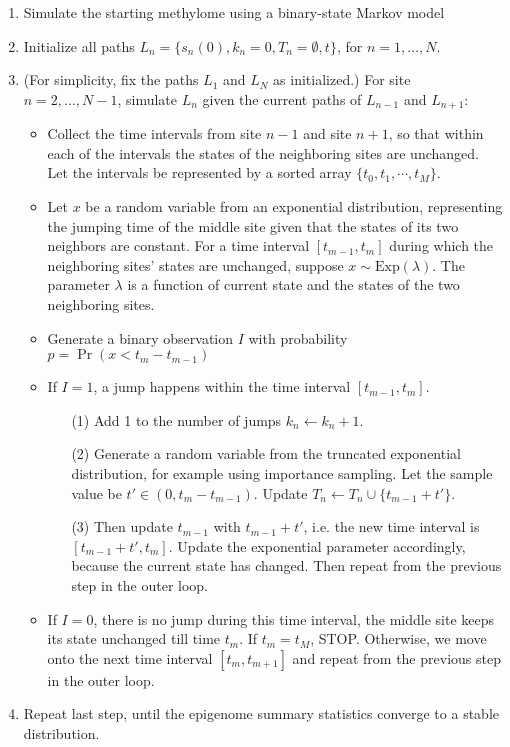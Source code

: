\documentclass[11pt]{article}
\begin{document}
\begin{enumerate}
\item Simulate the starting methylome using a binary-state Markov model
\item Initialize all paths $L_n = \{s_n(0), k_n=0, T_n=\emptyset, t\}$, for $n=1,\ldots, N.$
\item (For simplicity, fix the paths $L_1$ and $L_N$ as initialized.) For
  site $n = 2, \ldots, N-1$, simulate $L_n$ given the current paths of
  $L_{n-1}$ and $L_{n+1}$:
  \begin{itemize}
  \item Collect the time intervals from site $n-1$ and site $n+1$, so
    that within each of the intervals the states of the neighboring
    sites are unchanged. Let the intervals be represented by a sorted
    array $\{t_0, t_1, \cdots, t_M\}$.
  \item  Let $x$ be a random variable from an exponential
    distribution, representing the jumping time of the middle site given
    that the states of its two neighbors are constant.  For a time
    interval $[t_{m-1}, t_m]$ during which the neighboring sites' states
    are unchanged, suppose $x\sim \text{Exp}(\lambda)$. The parameter
    $\lambda$ is a function of current state and the states of the two
    neighboring sites.
  \item Generate a binary observation $I$ with probability $p = \Pr(x < t_m- t_{m-1})$
  \item If $I=1$, a jump happens within the time interval $[t_{m-1},
    t_m]$.
    \begin{enumerate}
      \item[(1)] Add 1 to the number of jumps $k_n \leftarrow k_n +1$.
      \item[(2)] Generate a random variable from the truncated exponential
        distribution, for example using importance sampling. Let the sample
        value be $t' \in (0, t_m -t_{m-1})$. Update $T_n \leftarrow
        T_n\cup\{t_{m-1}+t'\}$.
  \item[(3)] Then update $t_{m-1}$ with $t_{m-1}+t'$, i.e. the new
    time interval is $[t_{m-1}+t', t_m]$. Update the exponential parameter
    accordingly, because the current state has changed. Then repeat from
    the previous step in the outer loop.
    \end{enumerate}
  \item If $I=0$, there is no jump during this time interval, the
    middle site keeps its state unchanged till time $t_m$. If $t_m =
t_M$, STOP.  Otherwise, we move onto the next time interval $[t_m,
t_{m+1}]$ and repeat from the previous step in the outer loop.
  \end{itemize}
\item Repeat last step, until the epigenome summary statistics converge to
  a stable distribution.
\end{enumerate}
\end{document}
